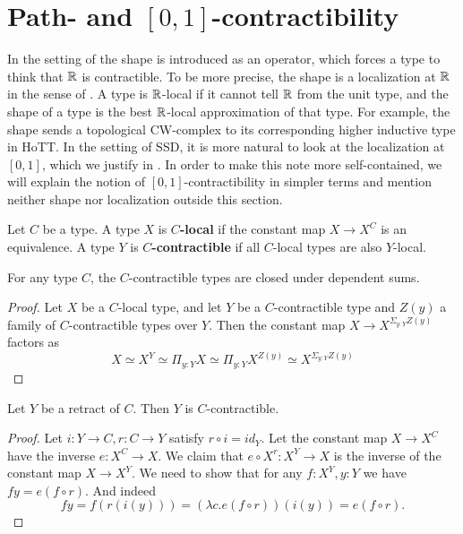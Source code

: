 \section{Path- and $[0,1]$-contractibility}
In the setting of \cite{shulman-Brouwer-fixed-point} the shape is introduced as an operator, which forces a type to think that $\mathbb{R}$ is contractible. 
To be more precise, the shape is a localization at $\mathbb{R}$ in the sense of \cite{modalities}.
A type is $\mathbb{R}$-local if it cannot tell $\mathbb{R}$ from the unit type, and the shape of a type is the best $\mathbb{R}$-local approximation of that type. 
For example, the shape sends a topological CW-complex to its corresponding higher inductive type in HoTT. 
In the setting of SSD, it is more natural to look at the localization at $[0,1]$, which we justify in . 
In order to make this note more self-contained, we will 
explain the notion of $[0,1]$-contractibility in simpler terms and
mention neither shape nor localization outside this section. 
\begin{definition}
  Let $C$ be a type. 
  A type $X$ is \textbf{$C$-local} if the constant map $X \to X^{C}$ is an equivalence. 
  A type $Y$ is \textbf{$C$-contractible} if all $C$-local types are also $Y$-local. 
\end{definition}
\begin{lemma}\label{contractibleSigma}
  For any type $C$, the $C$-contractible types are closed under dependent sums. 
\end{lemma}
\begin{proof}
  Let $X$ be a $C$-local type, and let 
  $Y$ be a $C$-contractible type and 
  $Z(y)$ a family of $C$-contractible types over $Y$. 
  Then the constant map $X \to X^{\Sigma_{y:Y} Z(y)}$ factors as 
  $$
  X \simeq 
  X^Y\simeq 
  \Pi_{y:Y} X \simeq 
  \Pi_{y:Y} X^{Z(y)} \simeq 
  X^{\Sigma_{y:Y} Z(y)} 
  $$
\end{proof}
\begin{lemma}\label{retractContractible}
  Let $Y$ be a retract of $C$. 
  Then $Y$ is $C$-contractible.
\end{lemma}
\begin{proof}
  Let $i: Y \to C,  r:C \to Y$ satisfy $r\circ i = id_Y$. 
  Let the constant map $X \to X^C$ have the inverse $e:X^C\to X$. 
  We claim that $e\circ X^r: X^Y \to X$ is the inverse of the constant map $X \to X^Y$. 
  We need to show that for any $f:X^Y,y:Y$ we have $f y = e(f \circ r)$. 
  And indeed $$f y = f (r (i (y))) =(\lambda c . e(f\circ r))(i(y)) = e(f\circ r).$$ 
\end{proof}

